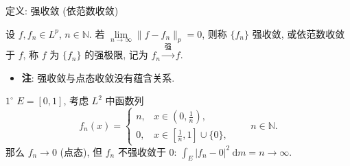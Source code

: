 
\begin{frame}{定义: 强收敛 (依范数收敛)}

\begin{Def}[强收敛]
设 $f, f_n \in L^p$, $n \in \mathbb{N}$. 若
$\lim\limits_{n \to \infty} \lVert f - f_n \rVert_p = 0$,
则称 $\{ f_n \}$ \alert{强收敛}, 或\alert{依范数收敛}于 $f$,
称 $f$ 为 $\{ f_n \}$ 的强极限, 记为 $f_n \xrightarrow{\ \text{强}\ } f$.
\end{Def}

\pause

\begin{itemize}
\item \textbf{注}: 强收敛与点态收敛\alert{没有蕴含关系}.
\end{itemize}

\textbf{$1^{\circ}$} $E = [0, 1]$, 考虑 $L^2$ 中函数列
\[
f_n(x) =
\begin{cases}
n, & x \in (0, \tfrac1n), \\
0, & x \in [\tfrac1n, 1] \cup \{ 0 \} ,
\end{cases}
\qquad n \in \mathbb{N}.
\]
那么 $f_n \to 0$ (点态), 但 $f_n$ 不强收敛于 $0$:
$\int_E |f_n - 0|^2 ~ \mathrm{d} m = n \to \infty$.

\end{frame}



